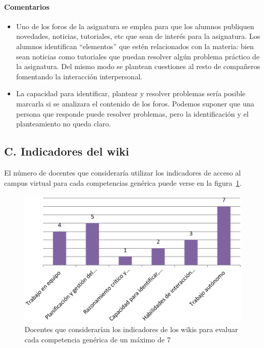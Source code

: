 \paragraph*{Comentarios}

\begin{itemize}
\item Uno de los foros de la asignatura se emplea para que los alumnos publiquen novedades, noticias, tutoriales, etc que sean de interés para la asignatura. Los alumnos identifican ``elementos'' que estén relacionados con la materia: bien sean noticias como tutoriales que puedan resolver algún problema práctico de la asignatura. Del mismo modo se plantean cuestiones al resto de compañeros fomentando la interacción interpersonal.
\item La capacidad para identificar, plantear y resolver problemas sería posible marcarla si se analizara el contenido de los foros. Podemos suponer que una persona que responde puede resolver problemas, pero la identificación y el planteamiento no queda claro.
\end{itemize}

	\subsection*{C. Indicadores del wiki}

El número de docentes que consideraría utilizar los indicadores de acceso al campus virtual para cada competencias genérica puede verse en la figura~\ref{fig:ape:aa:wikis}.

\begin{figure}[ht]
	\includegraphics[scale=0.35]{aa_wikis.png}
	\caption{Docentes que considerarían los indicadores de los wikis para evaluar cada competencia genérica de un máximo de 7}
	\label{fig:ape:aa:wikis}
\end{figure}


